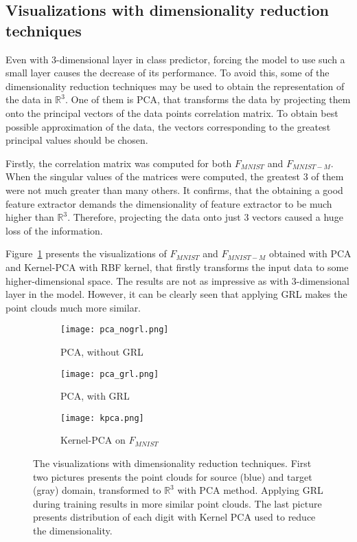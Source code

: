 \documentclass[shortabstract, inz, english]{iithesis}
\begin{document}
\subsection{Visualizations with dimensionality reduction techniques}
Even with 3-dimensional layer in class predictor, forcing the model to use such a small layer causes the decrease of its performance. To avoid this, some of the dimensionality reduction techniques may be used to obtain the representation of the data in $\mathbb{R}^{3}$. One of them is PCA, that transforms the data by projecting them onto the principal vectors of the data points correlation matrix. To obtain best possible approximation of the data, the vectors corresponding to the greatest principal values should be chosen. 
\par
Firstly, the correlation matrix was computed for both $F_{MNIST}$ and $F_{MNIST-M}$. When the singular values of the matrices were computed, the greatest 3 of them were not much greater than many others. It confirms, that the obtaining a good feature extractor demands the dimensionality of feature extractor to be much higher than $\mathbb{R}^{3}$. Therefore, projecting the data onto just 3 vectors caused a huge loss of the information. 
\par
Figure~\ref{fig:dim_red} presents the visualizations of $F_{MNIST}$ and $F_{MNIST-M}$ obtained with PCA and Kernel-PCA with RBF kernel, that firstly transforms the input data to some higher-dimensional space. The results are not as impressive as with 3-dimensional layer in the model. However, it can be clearly seen that applying GRL makes the point clouds much more similar. 

\begin{figure}[!htbp]%
    \centering
    
    \begin{subfigure}[b]{0.33\textwidth}
        \texttt{[image: pca\_nogrl.png]}
        \caption{PCA, without GRL}
    \end{subfigure}%
    \begin{subfigure}[b]{0.33\textwidth}
        \texttt{[image: pca\_grl.png]}
        \caption{PCA, with GRL}
    \end{subfigure}%
    \begin{subfigure}[b]{0.33\textwidth}
        \texttt{[image: kpca.png]}
        \caption{Kernel-PCA on $F_{MNIST}$}
    \end{subfigure}%
    \caption{The visualizations with dimensionality reduction techniques. First two pictures presents the point clouds for source (blue) and target (gray) domain, transformed to $\mathbb{R}^{3}$ with PCA method. Applying GRL during training results in more similar point clouds. The last picture presents distribution of each digit with Kernel PCA used to reduce the dimensionality.}%
    \label{fig:dim_red}%
\end{figure}
\end{document}
